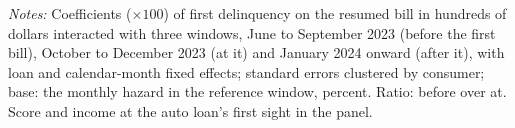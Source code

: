 \begin{table}[H]
\centering
\caption{The response to the resumed bill by group}
\label{tab:student_groups}
\small
\resizebox{\textwidth}{!}{}
\vspace{0.5em}
\begin{minipage}{0.92\textwidth}
\noindent \small \textit{Notes:} Coefficients ($\times 100$) of first delinquency on the resumed bill in hundreds of dollars interacted with three windows, June to September 2023 (before the first bill), October to December 2023 (at it) and January 2024 onward (after it), with loan and calendar-month fixed effects; standard errors clustered by consumer; base: the monthly hazard in the reference window, percent. Ratio: before over at. Score and income at the auto loan's first sight in the panel.
\end{minipage}
\end{table}


